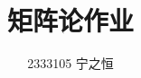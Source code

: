 \documentclass[12pt,a4paper]{ctexart}
\title{\heiti 矩阵论作业}
\author{2333105 宁之恒}
\date{}
\begin{document}
\maketitle
\section{}
\end{document}
